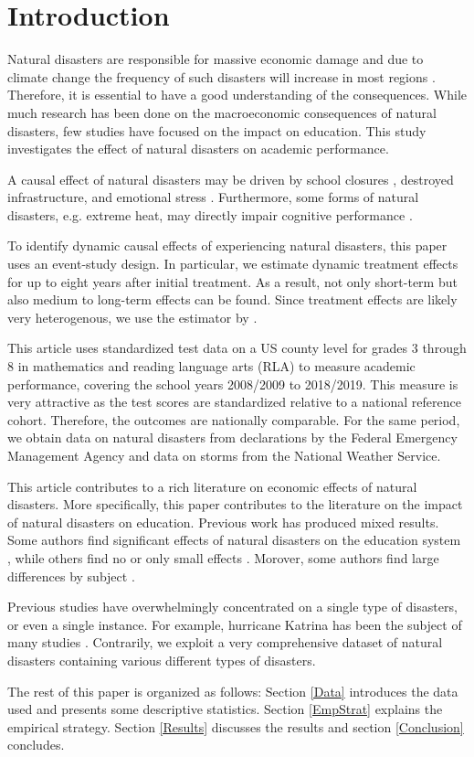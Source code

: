
\section{Introduction}

Natural disasters are responsible for massive economic damage and due to climate change the frequency of such disasters will increase in most regions \citep{IPCC_2021}. Therefore, it is essential to have a good understanding of the consequences. While much research has been done on the macroeconomic consequences of natural disasters, few studies have focused on the impact on education. This study investigates the effect of natural disasters on academic performance.

A causal effect of natural disasters may be driven by school closures \citep{Grewening_2020}, destroyed infrastructure, and emotional stress \citep{Vogel_2016}. Furthermore, some forms of natural disasters, e.g. extreme heat, may directly impair cognitive performance \citep{Ramsey_1995}.

To identify dynamic causal effects of experiencing natural disasters, this paper uses an event-study design. In particular, we estimate dynamic treatment effects for up to eight years after initial treatment. As a result, not only short-term but also medium to long-term effects can be found. Since treatment effects are likely very heterogenous, we use the estimator by \cite{Sun_2021}. 

This article uses standardized test data on a US county level for grades 3 through 8 in mathematics and reading language arts (RLA) to measure academic performance, covering the school years 2008/2009 to 2018/2019. This measure is very attractive as the test scores are standardized relative to a national reference cohort. Therefore, the outcomes are nationally comparable. For the same period, we obtain data on natural disasters from declarations by the Federal Emergency Management Agency and data on storms from the National Weather Service.

This article contributes to a rich literature on economic effects of natural disasters. More specifically, this paper contributes to the literature on the impact of natural disasters on education. Previous work has produced mixed results. Some authors find significant effects of natural disasters on the education system \citep{Holmes_2002, Cuaresma_2010, Sacerdote_2012, Goodman_2020}, while others find no or only small effects \citep{Baggerly_2008, Pane_2008}. Morover, some authors find large differences by subject \citep{Spencer_2016}.

Previous studies have overwhelmingly concentrated on a single type of disasters, or even a single instance. For example, hurricane Katrina has been the subject of many studies \citep[e.g.][]{Sacerdote_2012, Deryugina_2018}. Contrarily, we exploit a very comprehensive dataset of natural disasters containing various different types of disasters. 

The rest of this paper is organized as follows: Section \ref{Data} introduces the data used and presents some descriptive statistics. Section \ref{EmpStrat} explains the empirical strategy. Section \ref{Results} discusses the results and section \ref{Conclusion} concludes.

